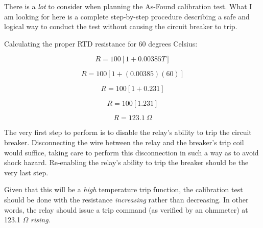 





There is a {\it lot} to consider when planning the As-Found calibration test.  What I am looking for here is a complete step-by-step procedure describing a safe and logical way to conduct the test without causing the circuit breaker to trip.







Calculating the proper RTD resistance for 60 degrees Celsius:

$$R = 100 [1 + 0.00385 T]$$

$$R = 100 [1 + (0.00385)(60)]$$

$$R = 100 [1 + 0.231]$$

$$R = 100 [1.231]$$

$$R = 123.1 \> \Omega$$

\vskip 10pt

The very first step to perform is to disable the relay's ability to trip the circuit breaker.  Disconnecting the wire between the relay and the breaker's trip coil would suffice, taking care to perform this disconnection in such a way as to avoid shock hazard.  Re-enabling the relay's ability to trip the breaker should be the very last step.  

Given that this will be a {\it high} temperature trip function, the calibration test should be done with the resistance {\it increasing} rather than decreasing.  In other words, the relay should issue a trip command (as verified by an ohmmeter) at 123.1 $\Omega$ {\it rising}.





